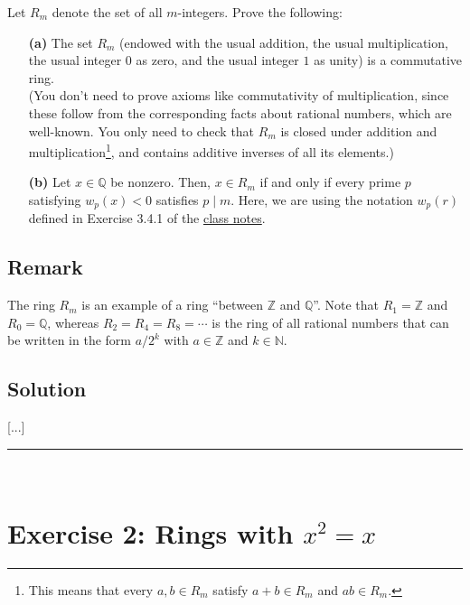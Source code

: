 \documentclass[paper=a4, fontsize=12pt]{scrartcl} %
\newcommand{\QQ}{\mathbb{Q}} %
\newcommand{\NN}{\mathbb{N}} %
\newcommand{\ZZ}{\mathbb{Z}} %
\newcommand{\tup}[1]{\left( #1 \right)}
\newcommand{\horrule}[1]{\rule{\linewidth}{#1}} %
\theoremstyle{plainsl}
\theoremstyle{definition}
\theoremstyle{remark}
\begin{document}
Let $R_m$ denote the set of all $m$-integers.
Prove the following:

\begin{enumerate}

\item[\textbf{(a)}] The set $R_m$ (endowed with the usual
addition, the usual multiplication, the usual integer $0$
as zero, and the usual integer $1$ as unity) is a
commutative ring. \\
(You don't need to prove axioms like commutativity of
multiplication, since these follow from the corresponding
facts about rational numbers, which are well-known.
You only need to check that $R_m$ is
closed under addition and multiplication\footnote{This
means that every $a, b \in R_m$ satisfy $a + b \in R_m$
and $a b \in R_m$.}, and contains
additive inverses of all its elements.)

\item[\textbf{(b)}] Let $x \in \QQ$ be nonzero.
Then, $x \in R_m$ if and only if every prime $p$ satisfying
$w_p\tup{x} < 0$ satisfies $p \mid m$.
Here, we are using the notation $w_p\tup{r}$ defined
in Exercise 3.4.1 of the
\href{http://www.cip.ifi.lmu.de/~grinberg/t/19s/notes.pdf}{class notes}.

\end{enumerate}

\subsection{Remark}

The ring $R_m$ is an example of a ring ``between $\ZZ$ and $\QQ$''.
Note that $R_1 = \ZZ$ and $R_0 = \QQ$, whereas $R_2 = R_4 = R_8 = \cdots$
is the ring of all rational numbers that can be written in the form
$a / 2^k$ with $a \in \ZZ$ and $k \in \NN$.

\subsection{Solution}

[...]

\horrule{0.3pt} \\[0.4cm]

\section{Exercise 2: Rings with $x^2 = x$}
\end{document}
